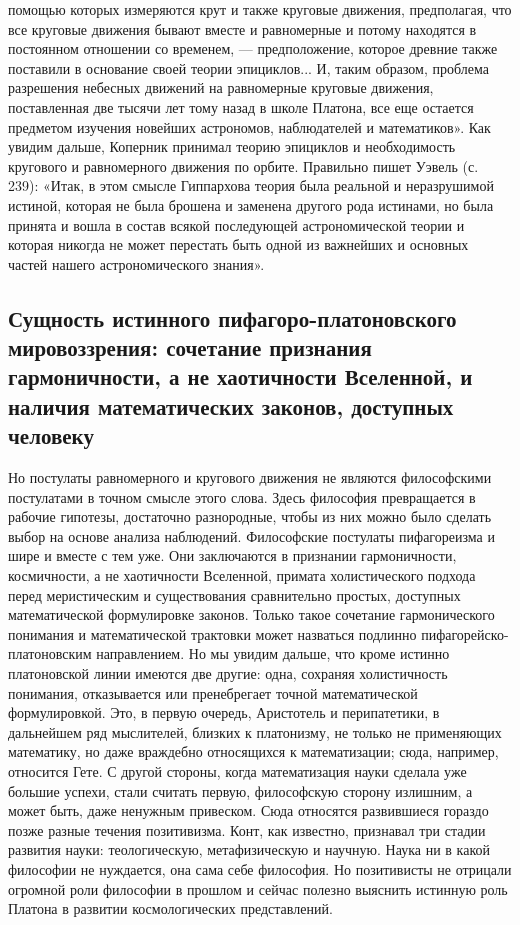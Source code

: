 помощью которых измеряются крут и также круговые движения,
предполагая, что все круговые движения бывают вместе и равномерные и
потому находятся в постоянном отношении со временем, ---
предположение, которое древние также поставили в основание своей
теории эпициклов... И, таким образом, проблема разрешения небесных
движений на равномерные круговые движения, поставленная две тысячи лет
тому назад в школе Платона, все еще остается предметом изучения
новейших астрономов, наблюдателей и математиков». Как увидим дальше,
Коперник принимал теорию эпициклов и необходимость кругового и
равномерного движения по орбите. Правильно пишет Уэвель (с. 239):
«Итак, в этом смысле Гиппархова теория была реальной и неразрушимой
истиной, которая не была брошена и заменена другого рода истинами, но
была принята и вошла в состав всякой последующей астрономической
теории и которая никогда не может перестать быть одной из важнейших и
основных частей нашего астрономического знания».

\subsection{Сущность истинного пифагоро-платоновского мировоззрения:
сочетание признания гармоничности, а не хаотичности Вселенной,
и наличия математических законов, доступных человеку}

Но постулаты равномерного и кругового движения не являются
философскими постулатами в точном смысле этого слова. Здесь философия
превращается в рабочие гипотезы, достаточно разнородные, чтобы из них
можно было сделать выбор на основе анализа наблюдений. Философские
постулаты пифагореизма и шире и вместе с тем уже. Они заключаются в
признании гармоничности, космичности, а не хаотичности Вселенной,
примата холистического подхода перед меристическим и существования
сравнительно простых, доступных математической формулировке законов.
Только такое сочетание гармонического понимания и математической
трактовки может назваться подлинно пифагорейско-платоновским
направлением. Но мы увидим дальше, что кроме истинно платоновской
линии имеются две другие: одна, сохраняя холистичность понимания,
отказывается или пренебрегает точной математической формулировкой.
Это, в первую очередь, Аристотель и перипатетики, в дальнейшем ряд
мыслителей, близких к платонизму, не только не применяющих математику,
но даже враждебно относящихся к математизации; сюда, например,
относится Гете. С другой стороны, когда математизация науки сделала
уже большие успехи, стали считать первую, философскую сторону
излишним, а может быть, даже ненужным привеском. Сюда относятся
развившиеся гораздо позже разные течения позитивизма. Конт, как
известно, признавал три стадии развития науки: теологическую,
метафизическую и научную. Наука ни в какой философии не нуждается, она
сама себе философия. Но позитивисты не отрицали огромной роли
философии в прошлом и сейчас полезно выяснить истинную роль Платона в
развитии космологических представлений.

